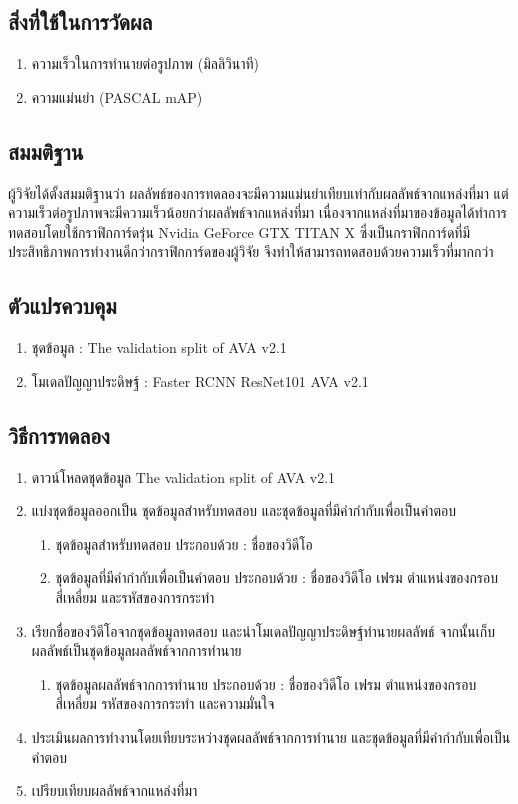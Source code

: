 \subsection*{สิ่งที่ใช้ในการวัดผล}
	\begin{enumerate}
		\setlength\itemsep{-0.25em}
		\item ความเร็วในการทำนายต่อรูปภาพ (มิลลิวินาที)
		\item ความแม่นยำ (PASCAL mAP)
	\end{enumerate}
\subsection*{สมมติฐาน}
ผู้วิจัยได้ตั้งสมมติฐานว่า ผลลัพธ์ของการทดลองจะมีความแม่นยำเทียบเท่ากับผลลัพธ์จากแหล่งที่มา แต่ความเร็วต่อรูปภาพจะมีความเร็วน้อยกว่าผลลัพธ์จากแหล่งที่มา 
เนื่องจากแหล่งที่มาของข้อมูลได้ทำการทดสอบโดยใช้กราฟิกการ์ดรุ่น Nvidia GeForce GTX TITAN X ซึ่งเป็นกราฟิกการ์ดที่มีประสิทธิภาพการทำงานดีกว่ากราฟิกการ์ดของผู้วิจัย จึงทำให้สามารถทดสอบด้วยความเร็วที่มากกว่า
\subsection*{ตัวแปรควบคุม}
	\begin{enumerate}
		\setlength\itemsep{-0.25em}
		\item ชุดข้อมูล : The validation split of AVA v2.1
		\item โมเดลปัญญาประดิษฐ์ : Faster RCNN ResNet101 AVA v2.1
	\end{enumerate}
\subsection*{วิธีการทดลอง}
	\begin{enumerate}
		\setlength\itemsep{-0.25em}
		\item ดาวน์โหลดชุดข้อมูล The validation split of AVA v2.1
		\item แบ่งชุดข้อมูลออกเป็น ชุดข้อมูลสำหรับทดสอบ และชุดข้อมูลที่มีคำกำกับเพื่อเป็นคำตอบ
			\begin{enumerate}
				\setlength\itemsep{-0.25em}
				\item ชุดข้อมูลสำหรับทดสอบ ประกอบด้วย : ชื่อของวิดีโอ
				\item ชุดข้อมูลที่มีคำกำกับเพื่อเป็นคำตอบ ประกอบด้วย : ชื่อของวิดีโอ เฟรม ตำแหน่งของกรอบสี่เหลี่ยม และรหัสของการกระทำ
			\end{enumerate}
		\item เรียกชื่อของวิดีโอจากชุดข้อมูลทดสอบ และนำโมเดลปัญญาประดิษฐ์ทำนายผลลัพธ์ จากนั้นเก็บผลลัพธ์เป็นชุดข้อมูลผลลัพธ์จากการทำนาย
			\begin{enumerate}
				\setlength\itemsep{-0.25em}
				\item ชุดข้อมูลผลลัพธ์จากการทำนาย ประกอบด้วย : ชื่อของวิดีโอ เฟรม ตำแหน่งของกรอบสี่เหลี่ยม รหัสของการกระทำ และความมั่นใจ
			\end{enumerate}
		\item ประเมินผลการทำงานโดยเทียบระหว่างชุดผลลัพธ์จากการทำนาย และชุดข้อมูลที่มีคำกำกับเพื่อเป็นคำตอบ
		\item เปรียบเทียบผลลัพธ์จากแหล่งที่มา
\end{enumerate}
\clearpage
